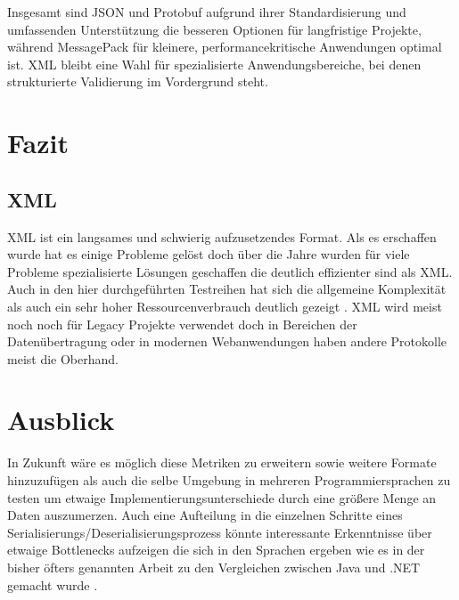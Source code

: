 \documentclass[ngerman]{seminarvorlage}
\begin{document}
Insgesamt sind JSON und Protobuf aufgrund ihrer Standardisierung und umfassenden Unterstützung die besseren Optionen für langfristige Projekte, während MessagePack für kleinere, performancekritische Anwendungen optimal ist. XML bleibt eine Wahl für spezialisierte Anwendungsbereiche, bei denen strukturierte Validierung im Vordergrund steht.


\section{Fazit}

\subsection{}

\subsection{XML}

XML ist ein langsames und schwierig aufzusetzendes Format. Als es erschaffen wurde hat es einige Probleme gelöst doch über die Jahre wurden für viele Probleme spezialisierte Lösungen geschaffen die deutlich effizienter sind als XML. Auch in den hier durchgeführten Testreihen hat sich die allgemeine Komplexität als auch ein sehr hoher Ressourcenverbrauch deutlich gezeigt \cite{Pommerenig_2019}. XML wird meist noch noch für Legacy Projekte verwendet doch in Bereichen der Datenübertragung oder in modernen Webanwendungen haben andere Protokolle meist die Oberhand.


\section{Ausblick}

In Zukunft wäre es möglich diese Metriken zu erweitern sowie weitere Formate hinzuzufügen als auch die selbe Umgebung in mehreren Programmiersprachen zu testen um etwaige Implementierungsunterschiede durch eine größere Menge an Daten auszumerzen. Auch eine Aufteilung in die einzelnen Schritte eines Serialisierungs/Deserialisierungsprozess könnte interessante Erkenntnisse über etwaige Bottlenecks aufzeigen die sich in den Sprachen ergeben wie es in der bisher öfters genannten Arbeit zu den Vergleichen zwischen Java und .NET gemacht wurde \cite{10.1145/944579.944589}. 

%
%


\newpage 

\end{document}
